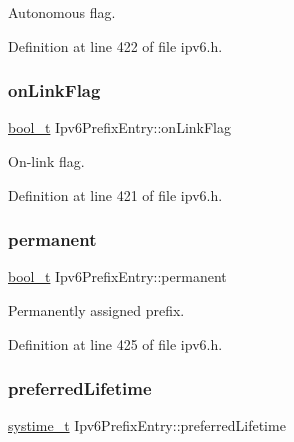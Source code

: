 Autonomous flag. 



Definition at line 422 of file ipv6.\+h.

\mbox{\label{structIpv6PrefixEntry_a235114a9f36acb687819948f0b8cd581}} 
\subsubsection{\texorpdfstring{on\+Link\+Flag}{onLinkFlag}}
{\footnotesize\ttfamily \hyperlink{compiler__port_8h_a812d16e5494522586b3784e55d479912}{bool\+\_\+t} Ipv6\+Prefix\+Entry\+::on\+Link\+Flag}



On-\/link flag. 



Definition at line 421 of file ipv6.\+h.

\mbox{\label{structIpv6PrefixEntry_a9f6301283cb4b3a6d2e3ffeed9e68f90}} 
\subsubsection{\texorpdfstring{permanent}{permanent}}
{\footnotesize\ttfamily \hyperlink{compiler__port_8h_a812d16e5494522586b3784e55d479912}{bool\+\_\+t} Ipv6\+Prefix\+Entry\+::permanent}



Permanently assigned prefix. 



Definition at line 425 of file ipv6.\+h.

\mbox{\label{structIpv6PrefixEntry_affc16d60fc2bd38a653b214a41968b0e}} 
\subsubsection{\texorpdfstring{preferred\+Lifetime}{preferredLifetime}}
{\footnotesize\ttfamily \hyperlink{compiler__port_8h_ae3e32a98d431a02106616da3071832dd}{systime\+\_\+t} Ipv6\+Prefix\+Entry\+::preferred\+Lifetime}



